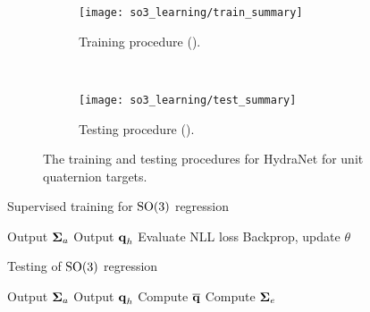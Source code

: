 \begin{figure}
\centering
\begin{subfigure}{0.49\textwidth}
	\centering
    \texttt{[image: so3\_learning/train\_summary]}
    \caption{Training procedure ().}
    \label{fig:hydranet_train_summary}
\end{subfigure}
~
\begin{subfigure}{0.49\textwidth}
	\centering
    \texttt{[image: so3\_learning/test\_summary]}
    \caption{Testing procedure ().}
    \label{fig:hydranet_test_summary}
\end{subfigure}
\caption{The training and testing procedures for HydraNet for unit quaternion targets.}
\label{fig:hydranet_so3_train_test}
\end{figure}


\begin{algorithm}
  \caption{Supervised training for $\mathrm{SO}(3)$ regression}
   \label{alg:train_hydranet}
   \begin{spacing}{1.1}
  \begin{algorithmic}[1]
    
    \State Output $\boldsymbol{\mathbf{\Sigma}}_a$ 
    \State Output  $\boldsymbol{\mathbf{q}}_h$ 
    \State Evaluate NLL loss 
     \State Backprop, update $\theta$
    \State {}
    \EndFunction
  \end{algorithmic}
  \end{spacing}
\end{algorithm}

\begin{algorithm}
  \caption{Testing of $\mathrm{SO}(3)$ regression}
   \label{alg:test_hydranet}
   \begin{spacing}{1.1}
  \begin{algorithmic}[1]
     \State Output $\boldsymbol{\mathbf{\Sigma}}_a$ 
    \State Output  $\boldsymbol{\mathbf{q}}_h$ 
    \State Compute $\Mean{\quat}$ 
    \State Compute $\boldsymbol{\mathbf{\Sigma}}_e$  
	\State \Return{$\Mean{\quat}$, $\Covh + \Covd$}
    \EndFunction
  \end{algorithmic}
  \end{spacing}
\end{algorithm}
